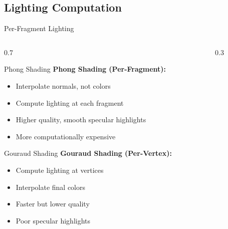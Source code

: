 \subsection{Lighting Computation}
\begin{frame}{Per-Fragment Lighting}
  \begin{columns}
    \small
    \begin{column}{0.7\textwidth}
      \begin{raybox}{Phong Shading}
        \textbf{Phong Shading (Per-Fragment):}
        \begin{itemize}
          \item Interpolate normals, not colors
          \item Compute lighting at each fragment
          \item Higher quality, smooth specular highlights
          \item More computationally expensive
        \end{itemize}
      \end{raybox}

      \footnotesize
      \begin{mathbox}{Gouraud Shading}
        \textbf{Gouraud Shading (Per-Vertex):}
        \begin{itemize}
          \item Compute lighting at vertices
          \item Interpolate final colors
          \item Faster but lower quality
          \item Poor specular highlights
        \end{itemize}
      \end{mathbox}
    \end{column}
    \begin{column}{0.3\textwidth}
    \end{column}
  \end{columns}
\end{frame}

